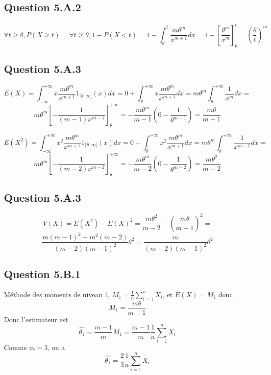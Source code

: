 \documentclass[]{book}
\theoremstyle{definition}
\begin{document}
\subsection*{Question 5.A.2}
$$
\forall t \geq \theta, P(X \geq t) = \forall t \geq \theta, 1 - P(X < t) = 1- \int_{\theta}^{t}{\frac{m \theta^m}{x^{m+1}} dx} = 1 - \left[\frac{\theta^m}{x^m}\right]_{\theta}^{t} = \left( \frac{\theta}{t}\right)^m
$$


\subsection*{Question 5.A.3}
$$
E(X) = \int_{-\infty}^{+\infty}{x \frac{m \theta^m}{x^{m+1}}1_{\lceil \theta, \infty[}(x) dx} =
0 + \int_{\theta}^{+\infty}{x\frac{m \theta^m}{x^{m+1}} dx} =
m \theta^m \int_{\theta}^{+\infty}{\frac{1}{x^{m}} dx} = 
$$
$$
m \theta^m \left[-\frac{1}{(m-1)x^{m-1}}\right]_{\theta}^{+\infty} = 
-\frac{m \theta^m}{m-1} \left(0 - \frac{1}{\theta^{m-1}}\right) =
\frac{m \theta}{m-1}
$$

\bigskip

$$
E(X^2) = \int_{-\infty}^{+\infty}{x^2 \frac{m \theta^m}{x^{m+1}}1_{\lceil \theta, \infty[}(x) dx} =
0 + \int_{\theta}^{+\infty}{x^2\frac{m \theta^m}{x^{m+1}} dx} =
m \theta^m \int_{\theta}^{+\infty}{\frac{1}{x^{m-1}} dx} = 
$$
$$
m \theta^m \left[-\frac{1}{(m-2)x^{m-2}}\right]_{\theta}^{+\infty} = 
-\frac{m \theta^m}{m-2} \left(0 - \frac{1}{\theta^{m-2}}\right) =
\frac{m \theta^2}{m-2}
$$

\subsection*{Question 5.A.3}

$$
V(X) = E(X^2) - E(X)^2 = \frac{m \theta^2}{m-2} - \left( \frac{m \theta}{m-1} \right)^2 =
$$
$$
\frac{m(m-1)^2-m^2(m-2)}{(m-2)(m-1)^2}\theta^2 = 
\frac{m}{(m-2)(m-1)^2}\theta^2
$$


\subsection*{Question 5.B.1}

M\'ethode des moments de niveau 1, $M_1 = \frac{1}{n}\sum_{i=1}^{n}{X_i}$, et $E(X) = M_1$ donc 
$$
M_1 = \frac{m \theta}{m-1}
$$
Donc l'estimateur est
$$
\hat{\theta_1} = \frac{m-1}{m}M_1 = \frac{m-1}{m}\frac{1}{n}\sum_{i=1}^{n}{X_i}
$$
Comme $m=3$, on a
$$
\hat{\theta_1} = \frac{2}{3}\frac{1}{n}\sum_{i=1}^{n}{X_i}
$$
\end{document}
